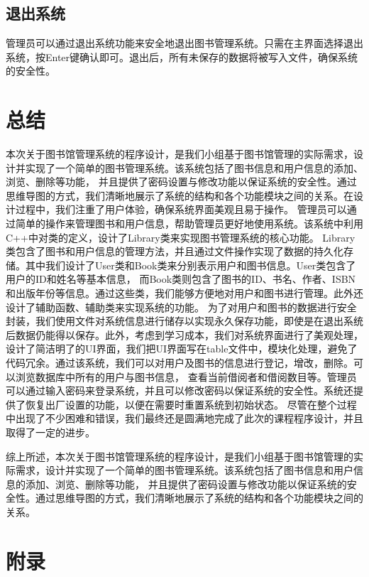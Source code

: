 \documentclass{article}
\begin{document}
\subsection{退出系统}
管理员可以通过退出系统功能来安全地退出图书管理系统。只需在主界面选择退出系统，按Enter键确认即可。退出后，所有未保存的数据将被写入文件，确保系统的安全性。

\section{总结}

本次关于图书馆管理系统的程序设计，是我们小组基于图书馆管理的实际需求，设计并实现了一个简单的图书管理系统。该系统包括了图书信息和用户信息的添加、浏览、删除等功能，
并且提供了密码设置与修改功能以保证系统的安全性。通过思维导图的方式，我们清晰地展示了系统的结构和各个功能模块之间的关系。在设计过程中，我们注重了用户体验，确保系统界面美观且易于操作。
管理员可以通过简单的操作来管理图书和用户信息，帮助管理员更好地使用系统。该系统中利用C++中对类的定义，设计了Library类来实现图书管理系统的核心功能。
Library类包含了图书和用户信息的管理方法，并且通过文件操作实现了数据的持久化存储。其中我们设计了User类和Book类来分别表示用户和图书信息。User类包含了用户的ID和姓名等基本信息，
而Book类则包含了图书的ID、书名、作者、ISBN和出版年份等信息。通过这些类，我们能够方便地对用户和图书进行管理。此外还设计了辅助函数、辅助类来实现系统的功能。
为了对用户和图书的数据进行安全封装，我们使用文件对系统信息进行储存以实现永久保存功能，即使是在退出系统后数据仍能得以保存。此外，考虑到学习成本，我们对系统界面进行了美观处理，
设计了简洁明了的UI界面，我们把UI界面写在table文件中，模块化处理，避免了代码冗余。通过该系统，我们可以对用户及图书的信息进行登记，增改，删除。可以浏览数据库中所有的用户与图书信息，
查看当前借阅者和借阅数目等。管理员可以通过输入密码来登录系统，并且可以修改密码以保证系统的安全性。系统还提供了恢复出厂设置的功能，以便在需要时重置系统到初始状态。
尽管在整个过程中出现了不少困难和错误，我们最终还是圆满地完成了此次的课程程序设计，并且取得了一定的进步。

综上所述，本次关于图书馆管理系统的程序设计，是我们小组基于图书馆管理的实际需求，设计并实现了一个简单的图书管理系统。该系统包括了图书信息和用户信息的添加、浏览、删除等功能，
并且提供了密码设置与修改功能以保证系统的安全性。通过思维导图的方式，我们清晰地展示了系统的结构和各个功能模块之间的关系。

\newpage
\section{附录}
\end{document}
